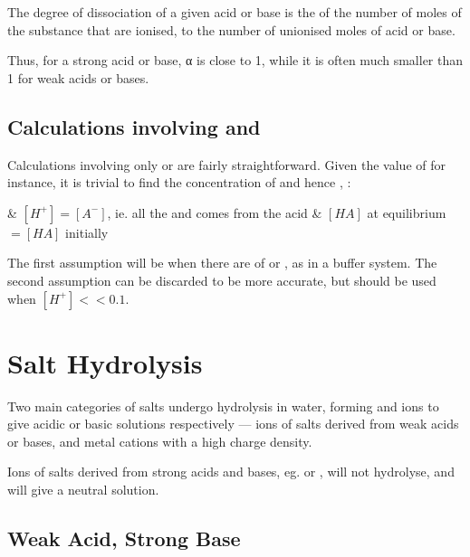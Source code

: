 			The degree of dissociation of a given acid or base is the  of the number of moles of the substance that are ionised, to
			the number of unionised moles of acid or base.


			Thus, for a strong acid or base, α is close to \num{1}, while it is often much smaller than \num{1} for weak acids or bases.



		\subsection{Calculations involving \MKa{} and \MKb{}}

			Calculations involving only \Ka{} or \Kb{} are fairly straightforward. Given the value of \Ka{} for instance, it is trivial
			to find the concentration of  and hence \pH{}, :

			\begin{bulletlist}
				& $[H^{+}] = [A^{-}]$, ie. all the  and  comes from the acid
				& $[HA]$ at equilibrium $ = [HA]$ initially
			\end{bulletlist}

			The first assumption will be  when there are  of  or , as in a buffer
			system. The second assumption can be discarded to be more accurate, but should be used when $[H^{+}] << 0.1$.



	\pagebreak
	\section{Salt Hydrolysis}

		Two main categories of salts undergo hydrolysis in water, forming  and  ions to give acidic or basic solutions
		respectively --- ions of salts derived from weak acids or bases, and metal cations with a high charge density.

		Ions of salts derived from strong acids and bases, eg.  or , will not hydrolyse, and will give a neutral solution.


		\subsection{Weak Acid, Strong Base}

